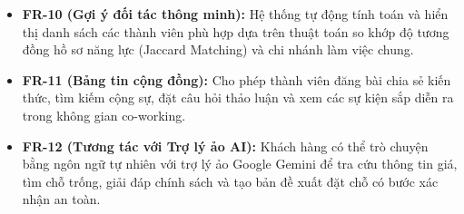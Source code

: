 \begin{itemize}
    \item \textbf{FR-10 (Gợi ý đối tác thông minh):} Hệ thống tự động tính toán và hiển thị danh sách các thành viên phù hợp dựa trên thuật toán so khớp độ tương đồng hồ sơ năng lực (Jaccard Matching) và chi nhánh làm việc chung.
    \item \textbf{FR-11 (Bảng tin cộng đồng):} Cho phép thành viên đăng bài chia sẻ kiến thức, tìm kiếm cộng sự, đặt câu hỏi thảo luận và xem các sự kiện sắp diễn ra trong không gian co-working.
    \item \textbf{FR-12 (Tương tác với Trợ lý ảo AI):} Khách hàng có thể trò chuyện bằng ngôn ngữ tự nhiên với trợ lý ảo Google Gemini để tra cứu thông tin giá, tìm chỗ trống, giải đáp chính sách và tạo bản đề xuất đặt chỗ có bước xác nhận an toàn.
\end{itemize}

